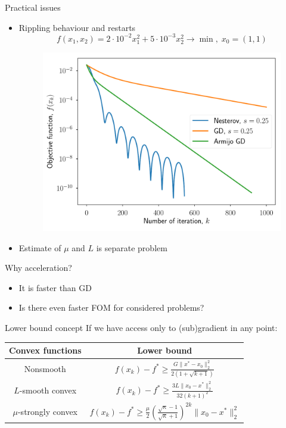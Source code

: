\documentclass{beamer}
\begin{document}
\begin{frame}{Practical issues}
\begin{itemize}
\item Rippling behaviour and restarts
\[
f(x_1, x_2) = 2 \cdot 10^{-2}x_1^2 + 5 \cdot 10^{-3}x^2_2 \to \min, \; x_0 = (1, 1)
\]
\begin{figure}
\centering
\includegraphics[scale=0.4]{nesterov_gd}
\end{figure}
\item Estimate of $\mu$ and $L$ is separate problem
\end{itemize}
\end{frame}

\begin{frame}{Why acceleration?}
\begin{itemize}
\item It is faster than GD
\item Is there even faster FOM for considered problems?
\end{itemize}
\end{frame}

\begin{frame}{Lower bound concept}
If we have access only to (sub)gradient in any point:
 
\begin{table}
\centering
\begin{tabular}{|c|c|}
\hline
Convex functions & Lower bound\\
\hline
Nonsmooth & $f(x_k) - f^* \geq \frac{G\|x^* - x_0\|_2^2}{2(1 + \sqrt{k+1})}$\\
\hline
$L$-smooth convex & $f(x_k) - f^* \geq \frac{3L \|x_0 - x^*\|_2^2}{32(k+1)^2}$\\
\hline
$\mu$-strongly convex & $f(x_k) - f^* \geq \frac{\mu}{2}\left(\frac{\sqrt{\kappa} - 1}{\sqrt{\kappa} + 1} \right)^{2k} \|x_0 - x^*\|_2^2$\\
\hline
\end{tabular}
\end{table}
\end{frame}
\end{document}
